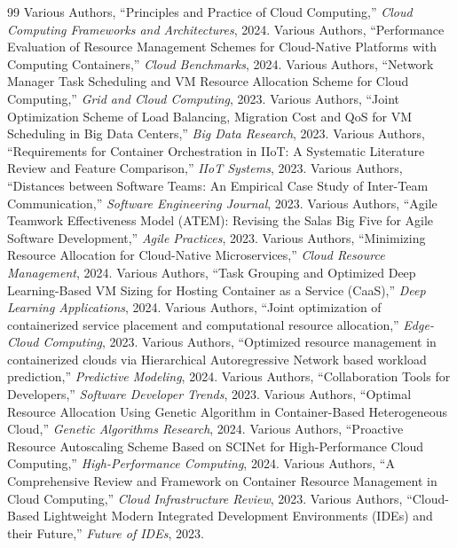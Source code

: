\documentclass[12pt,a4paper]{report}
\begin{document}
{\begin{thebibliography}{99}
 Various Authors, ``Principles and Practice of Cloud Computing,'' \textit{Cloud Computing Frameworks and Architectures}, 2024.
 Various Authors, ``Performance Evaluation of Resource Management Schemes for Cloud-Native Platforms with Computing Containers,'' \textit{Cloud Benchmarks}, 2024.
 Various Authors, ``Network Manager Task Scheduling and VM Resource Allocation Scheme for Cloud Computing,'' \textit{Grid and Cloud Computing}, 2023.
 Various Authors, ``Joint Optimization Scheme of Load Balancing, Migration Cost and QoS for VM Scheduling in Big Data Centers,'' \textit{Big Data Research}, 2023.
 Various Authors, ``Requirements for Container Orchestration in IIoT: A Systematic Literature Review and Feature Comparison,'' \textit{IIoT Systems}, 2023.
 Various Authors, ``Distances between Software Teams: An Empirical Case Study of Inter-Team Communication,'' \textit{Software Engineering Journal}, 2023.
 Various Authors, ``Agile Teamwork Effectiveness Model (ATEM): Revising the Salas Big Five for Agile Software Development,'' \textit{Agile Practices}, 2023.
 Various Authors, ``Minimizing Resource Allocation for Cloud-Native Microservices,'' \textit{Cloud Resource Management}, 2024.
 Various Authors, ``Task Grouping and Optimized Deep Learning-Based VM Sizing for Hosting Container as a Service (CaaS),'' \textit{Deep Learning Applications}, 2024.
 Various Authors, ``Joint optimization of containerized service placement and computational resource allocation,'' \textit{Edge-Cloud Computing}, 2023.
 Various Authors, ``Optimized resource management in containerized clouds via Hierarchical Autoregressive Network based workload prediction,'' \textit{Predictive Modeling}, 2024.
 Various Authors, ``Collaboration Tools for Developers,'' \textit{Software Developer Trends}, 2023.
 Various Authors, ``Optimal Resource Allocation Using Genetic Algorithm in Container-Based Heterogeneous Cloud,'' \textit{Genetic Algorithms Research}, 2024.
 Various Authors, ``Proactive Resource Autoscaling Scheme Based on SCINet for High-Performance Cloud Computing,'' \textit{High-Performance Computing}, 2024.
 Various Authors, ``A Comprehensive Review and Framework on Container Resource Management in Cloud Computing,'' \textit{Cloud Infrastructure Review}, 2023.
 Various Authors, ``Cloud-Based Lightweight Modern Integrated Development Environments (IDEs) and their Future,'' \textit{Future of IDEs}, 2023.

\end{thebibliography}}
\end{document}

